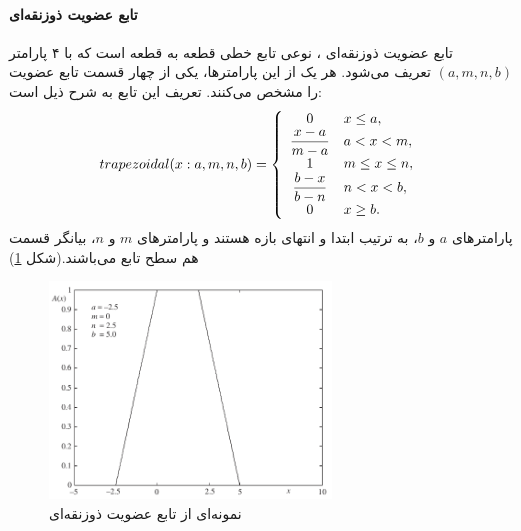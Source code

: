\paragraph{تابع عضویت ذوزنقه‌ای}
تابع عضویت ذوزنقه‌ای
،
 نوعی تابع خطی قطعه به قطعه است که با ۴ پارامتر $(a, m, n, b)$ تعریف می‌شود. هر یک از این پارامترها، یکی از چهار قسمت تابع عضویت را مشخص می‌کنند. تعریف این تابع به شرح ذیل است:
\begin{equation}\label{eq:e_fset_memfunc_trapezoidal}
trapezoidal (x: a, m, n, b) = \left\{ 
\begin{array}{cl}
0 &  x \leq a, \\ 
\mathlarger{\frac{x-a}{m-a}} & a<x<m, \\ 
1 & m \leq x \leq n, \\
\mathlarger{ \frac{b-x}{b-n}} & n<x<b, \\
0 & x \geq b.
\end{array}
\right.
\end{equation}
پارامترهای $a$ و $b$، به ترتیب ابتدا و انتهای بازه هستند و پارامترهای $m$ و $n$، بیانگر قسمت هم سطح تابع می‌باشند.(شکل \ref{fig:f_15})
\cite{Pedrycz2007}
\begin{figure}[h]
	\centering 
	\includegraphics[width=75mm]{Images/Fig15.png}
	\vspace{-0.5cm}
	\caption{نمونه‌ای از تابع عضویت ذوزنقه‌ای}\label{fig:f_15}
\end{figure}

